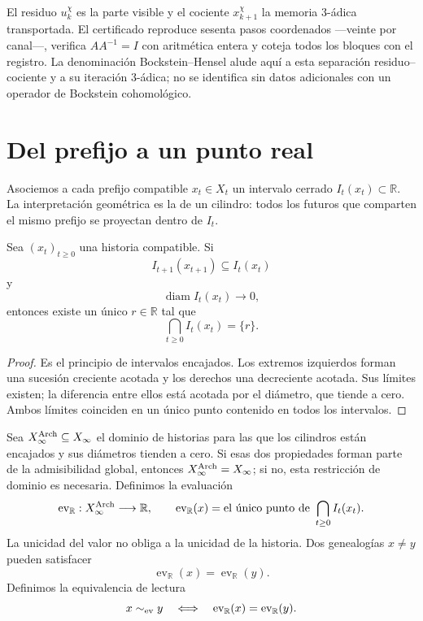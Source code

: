 El residuo \(u_k^\chi\) es la parte visible y el cociente
\(x_{k+1}^\chi\) la memoria 3-ádica transportada. El certificado reproduce
sesenta pasos coordenados ---veinte por canal---, verifica \(AA^{-1}=I\) con
aritmética entera y coteja todos los bloques con el registro. La denominación
Bockstein--Hensel alude aquí a esta separación residuo--cociente y a su
iteración 3-ádica; no se identifica sin datos adicionales con un operador de
Bockstein cohomológico.

\section{Del prefijo a un punto real}

Asociemos a cada prefijo compatible \(x_t\in X_t\) un intervalo cerrado
\(I_t(x_t)\subset\mathbb R\). La interpretación geométrica es la de un
cilindro: todos los futuros que comparten el mismo prefijo se proyectan dentro
de \(I_t\).

\begin{theorem}
Sea \((x_t)_{t\ge0}\) una historia compatible. Si
\[
I_{t+1}(x_{t+1})\subseteq I_t(x_t)
\]
y
\[
\operatorname{diam} I_t(x_t)\longrightarrow0,
\]
entonces existe un único \(r\in\mathbb R\) tal que
\[
\bigcap_{t\ge0}I_t(x_t)=\{r\}.
\]
\end{theorem}

\begin{proof}
Es el principio de intervalos encajados. Los extremos izquierdos forman una
sucesión creciente acotada y los derechos una decreciente acotada. Sus límites
existen; la diferencia entre ellos está acotada por el diámetro, que tiende a
cero. Ambos límites coinciden en un único punto contenido en todos los
intervalos.
\end{proof}

Sea \(X_\infty^{\rm Arch}\subseteq X_\infty\) el dominio de historias para
las que los cilindros están encajados y sus diámetros tienden a cero. Si esas
dos propiedades forman parte de la admisibilidad global, entonces
\(X_\infty^{\rm Arch}=X_\infty\); si no, esta restricción de dominio es
necesaria. Definimos la evaluación
\[
\operatorname{ev}_{\mathbb R}:X_\infty^{\rm Arch}\longrightarrow\mathbb R,
\qquad
\operatorname{ev}_{\mathbb R}(x)=
\text{el único punto de }\bigcap_{t\ge0}I_t(x_t).
\]
La unicidad del valor no obliga a la unicidad de la historia. Dos genealogías
\(x\ne y\) pueden satisfacer
\[
\operatorname{ev}_{\mathbb R}(x)
=\operatorname{ev}_{\mathbb R}(y).
\]
Definimos la equivalencia de lectura
\[
x\sim_{\rm ev}y
\quad\Longleftrightarrow\quad
\operatorname{ev}_{\mathbb R}(x)
=\operatorname{ev}_{\mathbb R}(y).
\]

